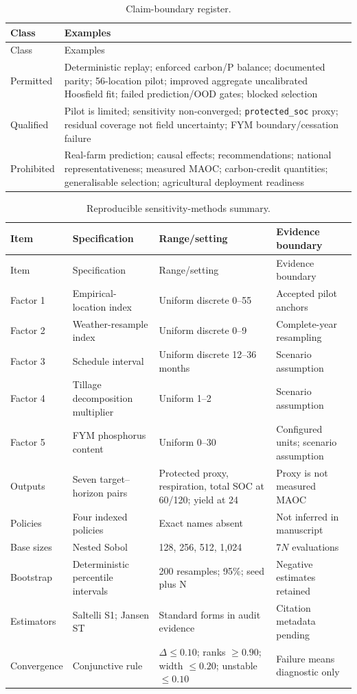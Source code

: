 \documentclass[11pt]{article}
\newcommand{\protectedSOC}{\texttt{protected\_soc}}
\begin{document}
\begin{longtable}{P{0.16\textwidth}P{0.76\textwidth}}
\caption{Claim-boundary register.}\label{tab:claims-supp}\\
\toprule Class & Examples \\
\midrule\endfirsthead
\toprule Class & Examples \\
\midrule\endhead
Permitted & Deterministic replay; enforced carbon/P balance; documented parity; 56-location pilot; improved aggregate uncalibrated Hoosfield fit; failed prediction/OOD gates; blocked selection \\
Qualified & Pilot is limited; sensitivity non-converged; \protectedSOC{} proxy; residual coverage not field uncertainty; FYM boundary/cessation failure \\
Prohibited & Real-farm prediction; causal effects; recommendations; national representativeness; measured MAOC; carbon-credit quantities; generalisable selection; agricultural deployment readiness \\
\bottomrule
\end{longtable}

\begin{longtable}{P{0.15\textwidth}P{0.22\textwidth}P{0.20\textwidth}P{0.25\textwidth}}
\caption{Reproducible sensitivity-methods summary.}\label{tab:sensitivity-methods}\\
\toprule Item & Specification & Range/setting & Evidence boundary \\
\midrule\endfirsthead
\toprule Item & Specification & Range/setting & Evidence boundary \\
\midrule\endhead
Factor 1 & Empirical-location index & Uniform discrete 0--55 & Accepted pilot anchors \\
Factor 2 & Weather-resample index & Uniform discrete 0--9 & Complete-year resampling \\
Factor 3 & Schedule interval & Uniform discrete 12--36 months & Scenario assumption \\
Factor 4 & Tillage decomposition multiplier & Uniform 1--2 & Scenario assumption \\
Factor 5 & FYM phosphorus content & Uniform 0--30 & Configured units; scenario assumption \\
Outputs & Seven target--horizon pairs & Protected proxy, respiration, total SOC at 60/120; yield at 24 & Proxy is not measured MAOC \\
Policies & Four indexed policies & Exact names absent & Not inferred in manuscript \\
Base sizes & Nested Sobol & 128, 256, 512, 1,024 & $7N$ evaluations \\
Bootstrap & Deterministic percentile intervals & 200 resamples; 95\%; seed plus N & Negative estimates retained \\
Estimators & Saltelli S1; Jansen ST & Standard forms in audit evidence & Citation metadata pending \\
Convergence & Conjunctive rule & $\Delta\leq0.10$; ranks $\geq0.90$; width $\leq0.20$; unstable $\leq0.10$ & Failure means diagnostic only \\
\bottomrule
\end{longtable}
\end{document}
